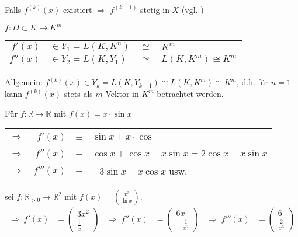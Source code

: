\begin{underlinedenvironment}[Hinweis]
	Falls $f^(k)(x)$ existiert $\Rightarrow$ $f^{(k-1)}$ stetig in $X$  (vgl. )
\end{underlinedenvironment}
\begin{underlinedenvironment}[Speziafall $n=1$]
	$f:D\subset K\to K^m$\\
	\begin{tabularx}{\linewidth}{r@{$\;$}l@{$\,$}c@{$\,$}X}
	$f'(x)$ & $\in Y_1 = L(K, K^n)$ & $\cong$ & $K^m$ \\
	$f''(x)$ & $\in Y_2 = L(K, Y_1)$ & $\cong$ &  $L(K, K^m)\cong K^m$
	\end{tabularx}
	Allgemein: $f^{(k)}(x) \in Y_k = L(K, Y_{k-1}) \cong L(K, K^m)\cong K^m$, d.h. für $n=1$ kann $f^{(k)}(x)$ stets als $m$-Vektor in $K^m$ betrachtet werden.
\end{underlinedenvironment}

\begin{example}
	Für $f:\mathbb{R}\to\mathbb{R}$ mit $f(x) = x\cdot \sin x$\\ \begin{tabularx}{\linewidth}{r@{\ \ }r@{\ }c@{\ }l}
		$\Rightarrow$ & $f'(x)$ & = & $\sin x + x\cdot \cos $ \\
		$\Rightarrow$ & $f''(x)$ & = & $\cos x + \cos x - x \sin x = 2 \cos x - x \sin x$ \\
		$\Rightarrow$ & $f'''(x)$ & = & $-3\sin x - x\cos x$ usw.
	\end{tabularx}
\end{example}

\begin{example}
	sei $f:\mathbb{R}_{> 0}\to\mathbb{R}^2$ mit $f(x) = \binom{x^3}{\ln x}$. \begin{align*}
		\Rightarrow\;f'(x) &= \begin{pmatrix}
			3x^2 \\ \frac{1}{x}
		\end{pmatrix} & \Rightarrow\; f''(x) &= \begin{pmatrix}
			6x \\ -\frac{1}{x^2}
		\end{pmatrix} & \Rightarrow\; f'''(x) &= \begin{pmatrix}
			6 \\ \frac{2}{x^3}
		\end{pmatrix}
	\end{align*}
\end{example}

